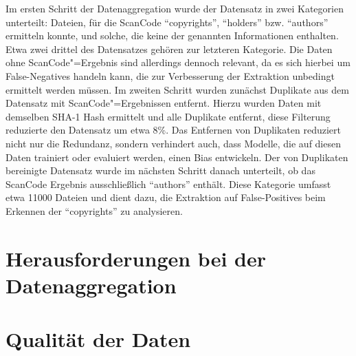 Im ersten Schritt der Datenaggregation wurde der Datensatz in zwei Kategorien unterteilt: Dateien, für die ScanCode \enquote{copyrights}, \enquote{holders} bzw. \enquote{authors} ermitteln konnte, und solche, die keine der genannten Informationen enthalten.
Etwa zwei drittel des Datensatzes gehören zur letzteren Kategorie.
Die Daten ohne ScanCode"=Ergebnis sind allerdings dennoch relevant, da es sich hierbei um False-Negatives handeln kann, die zur Verbesserung der Extraktion unbedingt ermittelt werden müssen.
Im zweiten Schritt wurden zunächst Duplikate aus dem Datensatz mit ScanCode"=Ergebnissen entfernt.
Hierzu wurden Daten mit demselben SHA-1 Hash ermittelt und alle Duplikate entfernt, diese Filterung reduzierte den Datensatz um etwa 8\%.
Das Entfernen von Duplikaten reduziert nicht nur die Redundanz, sondern verhindert auch, dass Modelle, die auf diesen Daten trainiert oder evaluiert werden, einen Bias entwickeln.
Der von Duplikaten bereinigte Datensatz wurde im nächsten Schritt danach unterteilt, ob das ScanCode Ergebnis ausschließlich \enquote{authors} enthält.
Diese Kategorie umfasst etwa 11000 Dateien und dient dazu, die Extraktion auf False-Positives beim Erkennen der \enquote{copyrights} zu analysieren.

\section{Herausforderungen bei der Datenaggregation}\label{sec:herausforderungen-datenaggregation}

\section{Qualität der Daten}\label{sec:qualitat-der-daten}


